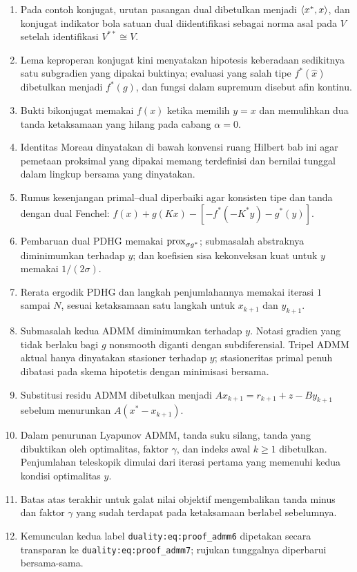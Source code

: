 \documentclass[indonesian]{shinybook}
\begin{document}
\begin{enumerate}
    \item Pada contoh konjugat, urutan pasangan dual dibetulkan menjadi $\left\langle x^* , x\right\rangle$, dan konjugat indikator bola satuan dual diidentifikasi sebagai norma asal pada $V$ setelah identifikasi $V^{**}\cong V$.
    \item Lema keproperan konjugat kini menyatakan hipotesis keberadaan sedikitnya satu subgradien yang dipakai buktinya; evaluasi yang salah tipe $f^*(\hat x)$ dibetulkan menjadi $f^*(g)$, dan fungsi dalam supremum disebut afin kontinu.
    \item Bukti bikonjugat memakai $f(x)$ ketika memilih $y=x$ dan memulihkan dua tanda ketaksamaan yang hilang pada cabang $\alpha=0$.
    \item Identitas Moreau dinyatakan di bawah konvensi ruang Hilbert bab ini agar pemetaan proksimal yang dipakai memang terdefinisi dan bernilai tunggal dalam lingkup bersama yang dinyatakan.
    \item Rumus kesenjangan primal--dual diperbaiki agar konsisten tipe dan tanda dengan dual Fenchel: $f(x)+g(Kx)-[-f^*(-K^*y)-g^*(y)]$.
    \item Pembaruan dual PDHG memakai $\mathrm{prox}_{\sigma g^*}$; submasalah abstraknya diminimumkan terhadap $y$; dan koefisien sisa kekonveksan kuat untuk $y$ memakai $1/(2\sigma)$.
    \item Rerata ergodik PDHG dan langkah penjumlahannya memakai iterasi $1$ sampai $N$, sesuai ketaksamaan satu langkah untuk $x_{k+1}$ dan $y_{k+1}$.
    \item Submasalah kedua ADMM diminimumkan terhadap $y$. Notasi gradien yang tidak berlaku bagi $g$ nonsmooth diganti dengan subdiferensial. Tripel ADMM aktual hanya dinyatakan stasioner terhadap $y$; stasioneritas primal penuh dibatasi pada skema hipotetis dengan minimisasi bersama.
    \item Substitusi residu ADMM dibetulkan menjadi $Ax_{k+1}=r_{k+1}+z-By_{k+1}$ sebelum menurunkan $A(x^*-x_{k+1})$.
    \item Dalam penurunan Lyapunov ADMM, tanda suku silang, tanda yang dibuktikan oleh optimalitas, faktor $\gamma$, dan indeks awal $k\geq1$ dibetulkan. Penjumlahan teleskopik dimulai dari iterasi pertama yang memenuhi kedua kondisi optimalitas $y$.
    \item Batas atas terakhir untuk galat nilai objektif mengembalikan tanda minus dan faktor $\gamma$ yang sudah terdapat pada ketaksamaan berlabel sebelumnya.
    \item Kemunculan kedua label \texttt{duality:eq:proof\_admm6} dipetakan secara transparan ke \texttt{duality:eq:proof\_admm7}; rujukan tunggalnya diperbarui bersama-sama.

\end{enumerate}
\end{document}
